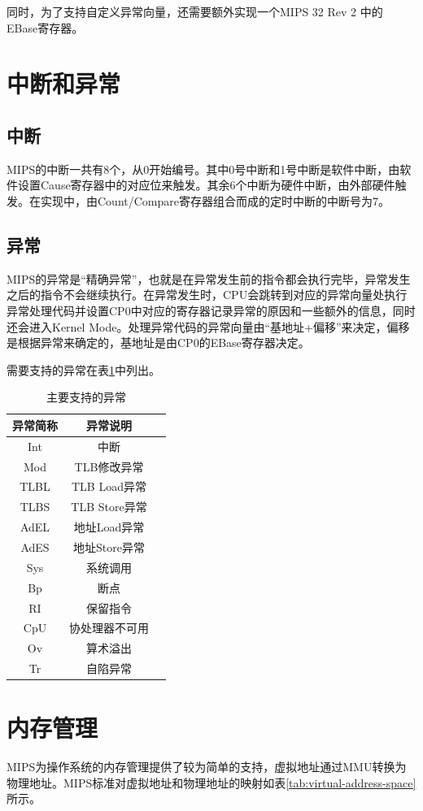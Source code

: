同时，为了支持自定义异常向量，还需要额外实现一个MIPS 32 Rev 2 中的 EBase寄存器。

\section{中断和异常}
\subsection{中断}
MIPS的中断一共有8个，从0开始编号。其中0号中断和1号中断是软件中断，由软件设置Cause寄存器中的对应位来触发。其余6个中断为硬件中断，由外部硬件触发。在实现中，由Count/Compare寄存器组合而成的定时中断的中断号为7。

\subsection{异常}
MIPS的异常是“精确异常”，也就是在异常发生前的指令都会执行完毕，异常发生之后的指令不会继续执行。在异常发生时，CPU会跳转到对应的异常向量处执行异常处理代码并设置CP0中对应的寄存器记录异常的原因和一些额外的信息，同时还会进入Kernel Mode。处理异常代码的异常向量由“基地址+偏移”来决定，偏移是根据异常来确定的，基地址是由CP0的EBase寄存器决定。

需要支持的异常在表\ref{table:main-exception}中列出。

\begin{table}[htbp]
	\centering
	\begin{tabular}{|c|c|l|} \hline
		\textbf{异常简称} & \textbf{异常说明} \\ \hline
		Int & 中断  \\ \hline
		Mod & TLB修改异常 \\ \hline
		TLBL & TLB Load异常 \\ \hline
		TLBS & TLB Store异常 \\ \hline
		AdEL & 地址Load异常 \\ \hline
		AdES & 地址Store异常 \\ \hline
		Sys & 系统调用 \\ \hline
		Bp & 断点 \\ \hline
		RI & 保留指令 \\ \hline
		CpU & 协处理器不可用 \\ \hline
		Ov & 算术溢出 \\ \hline
		Tr & 自陷异常 \\ \hline
	\end{tabular}
	\caption{主要支持的异常}
	\label{table:main-exception}
\end{table}
\section{内存管理}
MIPS为操作系统的内存管理提供了较为简单的支持，虚拟地址通过MMU转换为物理地址。MIPS标准对虚拟地址和物理地址的映射如表\ref{tab:virtual-address-space}所示。

